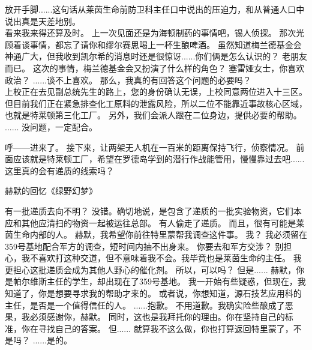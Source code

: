 \documentclass[openany]{book}
\begin{document}
\begin{dialogue}
     放开手脚......这句话从莱茵生命前防卫科主任口中说出的压迫力，和从普通人口中说出真是天差地别。
    \\
     看来我来得还算及时。
     上一次见面还是为海顿制药的事情吧，锡人侦探。
     那次光顾着谈事情，都忘了请你和缪尔赛思喝上一杯生酿啤酒。
     虽然知道梅兰德基金会神通广大，但我收到凯尔希的消息时还是很惊讶......你们俩是怎么认识的？
     老朋友而已。
     这次的事情，梅兰德基金会又扮演了什么样的角色？
     塞雷娅女士，你喜欢政治？
     ......谈不上喜欢。
     那么，我真的有回答这个问题的必要吗？
    \\
     上校正在去见副总统先生的路上，您的身份确认无误，上校同意两位进入十三区。
     但目前我们正在紧急排查化工原料的泄露风险，所以二位不能靠近事故核心区域，也就是特莱顿第三化工厂。
     另外，我们会派人跟在二位身边，提供必要的帮助。
     ......
     没问题，一定配合。
\end{dialogue}
\par

\begin{dialogue}
     呼——进来了。
     接下来，让两架无人机在一百米的距离保持飞行，侦察情况。
     前面应该就是特莱顿工厂，希望在罗德岛学到的潜行作战能管用，慢慢靠过去吧......
     这里真的会有递质的线索吗？
\end{dialogue}
\par

{
    \begin{center}赫默的回忆《绿野幻梦》\end{center}
    \begin{dialogue}
         有一批递质去向不明？
         没错。确切地说，是包含了递质的一批实验物资，它们本应和其他应清扫的物资一起被运往总部。
         有人偷走了递质。
         而且，很有可能是莱茵生命内部的人。
         赫默，我希望你前往特里蒙帮我调查这件事。
         我？
         我必须留在359号基地配合军方的调查，短时间内抽不出身来。
         你要去和军方交涉？
         别担心，我不喜欢打这种交道，但不意味着我不会。我毕竟也是莱茵生命的主任。
         我更担心这批递质会成为其他人野心的催化剂。
         所以，可以吗？
         但是......
         赫默，你是帕尔维斯主任的学生，却出现在了359号基地。
         我一开始有些疑惑，但现在，我知道了，你是想要寻求我的帮助才来的。
         或者说，你想知道，源石技艺应用科的主任，是否是一个值得信任的人。
         ......抱歉。
         不用道歉。我确实险些酿成了恶果，我必须感谢你，赫默。
         同时，这也是我拜托你的理由。你在坚持自己的标准，你在寻找自己的答案。
         但......
         就算我不这么做，你也打算返回特里蒙了，不是吗？
         ......是的。
    \end{dialogue}}
\par
\end{document}

